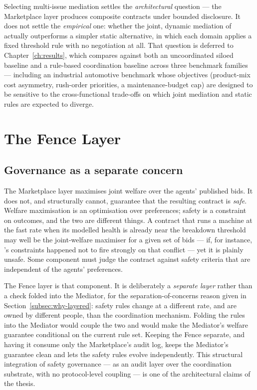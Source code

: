 Selecting multi-issue mediation settles the \emph{architectural}
question --- the Marketplace layer produces composite contracts under
bounded disclosure. It does not settle the \emph{empirical} one:
whether the joint, dynamic mediation of \NEXUS{} actually outperforms a
simpler static alternative, in which each domain applies a fixed
threshold rule with no negotiation at all. That question is deferred to
Chapter~\ref{ch:results}, which compares \NEXUS{} against both an
uncoordinated siloed baseline and a rule-based coordination baseline
across three benchmark families --- including an industrial automotive
benchmark whose objectives (product-mix cost asymmetry, rush-order
priorities, a maintenance-budget cap) are designed to be sensitive to
the cross-functional trade-offs on which joint mediation and static
rules are expected to diverge.

\section{The Fence Layer}
\label{sec:arch-fence}

\subsection{Governance as a separate concern}
\label{subsec:fence-rationale}

The Marketplace layer maximises joint welfare over the agents'
published bids. It does not, and structurally cannot, guarantee that the
resulting contract is \emph{safe}. Welfare maximisation is an
optimisation over preferences; safety is a constraint on outcomes, and
the two are different things. A contract that runs a machine at the
fast rate when its modelled health is already near the breakdown
threshold may well be the joint-welfare maximiser for a given set of
bids --- if, for instance, \PMA{}'s constraints happened not to fire
strongly on that conflict --- yet it is plainly unsafe. Some component
must judge the contract against safety criteria that are independent of
the agents' preferences.

The Fence layer is that component. It is deliberately a \emph{separate
layer} rather than a check folded into the Mediator, for the
separation-of-concerns reason given in
Section~\ref{subsec:why-layered}: safety rules change at a different
rate, and are owned by different people, than the coordination
mechanism. Folding the rules into the Mediator would couple the two and
would make the Mediator's welfare guarantee conditional on the current
rule set. Keeping the Fence separate, and having it consume only the
Marketplace's audit log, keeps the Mediator's guarantee clean and lets
the safety rules evolve independently. This structural integration of
safety governance --- as an audit layer over the coordination
substrate, with no protocol-level coupling --- is one of the
architectural claims of the thesis.

